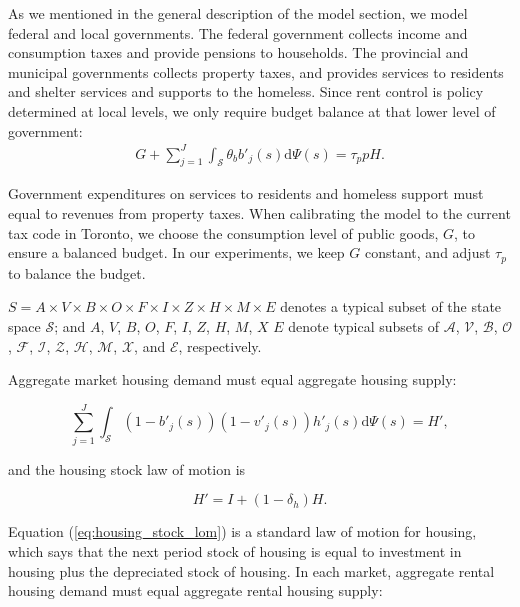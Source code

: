 \documentclass[parskip=full]{article}
\begin{document}
As we mentioned in the general description of the model section, we model federal and local governments. The federal government collects income and consumption taxes and provide pensions to households. The provincial and municipal governments collects property taxes, and provides services to residents and shelter services and supports to the homeless. Since rent control is policy determined at local levels, we only require budget balance at that lower level of government:
\begin{align}\label{eq:gbc}
  G + \sum_{j=1}^J \int_\mathcal{S} \theta_{b} b'_{j}(s)\mathrm{d}\Psi(s)  = \tau_{p} p H.
\end{align}

\noindent Government expenditures on services to residents and homeless support must equal to revenues from property taxes. When calibrating the model to the current tax code in Toronto, we choose the consumption level of public goods, $G$, to ensure a balanced budget. In our experiments, we keep $G$ constant, and adjust $\tau_{p}$ to balance the budget. 

$S=A\times V\times B\times O \times F \times I \times Z \times H\times M\times E$ denotes a typical subset of the state space $\mathcal{S}$; and $A$, $V$, $B$, $O$, $F$, $I$, $Z$, $H$, $M$, $X$ $E$ denote typical subsets of $\mathcal{A}$, $\mathcal{V}$, $\mathcal{B}$, $\mathcal{O}$, $\mathcal{F}$, $\mathcal{I}$, $\mathcal{Z}$, $\mathcal{H}$, $\mathcal{M}$, $\mathcal{X}$, and $\mathcal{E}$, respectively.

Aggregate market housing demand must equal aggregate housing supply:

\begin{equation}
\label{eq:housing_clearing_condition}
  \sum_{j=1}^J \int_\mathcal{S} (1-b'_{j}(s))(1-v'_{j}(s)) h'_{j}(s) \mathrm{d}\Psi(s) = H',
\end{equation}

\noindent and the housing stock law of motion is 

\begin{equation}\label{eq:housing_stock_lom}
H'=I+(1-\delta_h)H.
\end{equation}


\noindent Equation (\ref{eq:housing_stock_lom}) is a standard law of motion for housing, which says that the next period stock of housing is equal to investment in housing plus the depreciated stock of housing. In each market, aggregate rental housing demand must equal aggregate rental housing supply:
\end{document}
